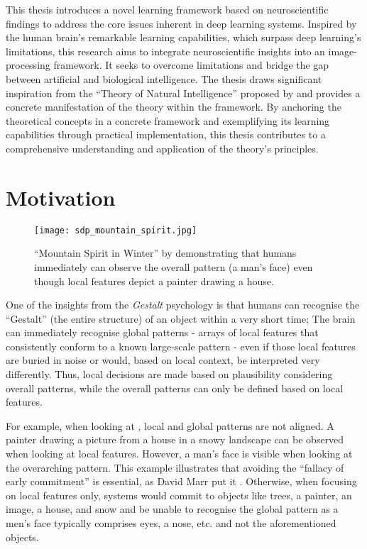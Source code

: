 This thesis introduces a novel learning framework based on neuroscientific findings to address the core issues inherent in deep learning systems. Inspired by the human brain's remarkable learning capabilities, which surpass deep learning's limitations, this research aims to integrate neuroscientific insights into an image-processing framework. It seeks to overcome limitations and bridge the gap between artificial and biological intelligence. The thesis draws significant inspiration from the ``Theory of Natural Intelligence'' proposed by  and provides a concrete manifestation of the theory within the framework. By anchoring the theoretical concepts in a concrete framework and exemplifying its learning capabilities through practical implementation, this thesis contributes to a comprehensive understanding and application of the theory's principles.

\section{Motivation}
\begin{figure}[h]
    \centering
    \texttt{[image: sdp\_mountain\_spirit.jpg]}
    \caption[``Mountain Spirit in Winter'' by Sandro del Prete]{``Mountain Spirit in Winter'' by  demonstrating that humans immediately can observe the overall pattern (a man's face) even though local features depict a painter drawing a house.}
\end{figure}

One of the insights from the \emph{Gestalt} psychology  is that humans can recognise the ``Gestalt'' (the entire structure) of an object within a very short time; The brain can immediately recognise global patterns - arrays of local features that consistently conform to a known large-scale pattern - even if those local features are buried in noise or would, based on local context, be interpreted very differently. Thus, local decisions are made based on plausibility considering overall patterns, while the overall patterns can only be defined based on local features.

For example, when looking at , local and global patterns are not aligned. A painter drawing a picture from a house in a snowy landscape can be observed when looking at local features. However, a man's face is visible when looking at the overarching pattern.
This example illustrates that avoiding the ``fallacy of early commitment'' is essential, as David Marr put it .
Otherwise, when focusing on local features only, systems would commit to objects like trees, a painter, an image, a house, and snow and be unable to recognise the global pattern as a men's face typically comprises eyes, a nose, etc. and not the aforementioned objects.

